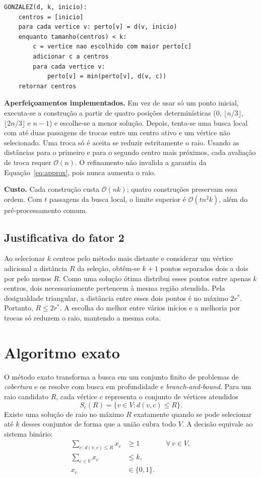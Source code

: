 \documentclass[12pt,a4paper]{article}
\newcommand{\bigO}[1]{\mathcal O\!\left(#1\right)}
\begin{document}
\begin{lstlisting}[caption={Construção aproximada dos centros (uma inicialização).}]
GONZALEZ(d, k, inicio):
    centros = [inicio]
    para cada vertice v: perto[v] = d(v, inicio)
    enquanto tamanho(centros) < k:
        c = vertice nao escolhido com maior perto[c]
        adicionar c a centros
        para cada vertice v:
            perto[v] = min(perto[v], d(v, c))
    retornar centros
\end{lstlisting}

\noindent\textbf{Aperfeiçoamentos implementados.}
Em vez de usar só um ponto inicial, executa-se a construção a partir de
quatro posições determinísticas ($0$, $\lfloor n/3\rfloor$,
$\lfloor 2n/3\rfloor$ e $n-1$) e escolhe-se a menor solução.
Depois, tenta-se uma busca local com até duas passagens de trocas entre
um centro ativo e um vértice não selecionado. Uma troca só é aceita se
reduzir estritamente o raio. Usando as distâncias para o primeiro e para
o segundo centro mais próximos, cada avaliação de troca requer
$\bigO{n}$. O refinamento não invalida a garantia da
Equação~\ref{eq:approx}, pois nunca aumenta o raio.

\noindent\textbf{Custo.}
Cada construção custa $\bigO{nk}$; quatro construções preservam essa
ordem. Com $t$ passagens da busca local, o limite superior é
$\bigO{tn^2k}$, além do pré-processamento comum.

\subsection{Justificativa do fator 2}
Ao selecionar $k$ centros pelo método mais distante e considerar um
vértice adicional a distância $R$ da seleção, obtêm-se $k+1$ pontos
separados dois a dois por pelo menos $R$. Como uma solução ótima distribui
esses pontos entre apenas $k$ centros, dois necessariamente pertencem à
mesma região atendida. Pela desigualdade triangular, a distância entre
esses dois pontos é no máximo $2r^*$. Portanto, $R\leq 2r^*$.
A escolha do melhor entre vários inícios e a melhoria por trocas só
reduzem o raio, mantendo a mesma cota.

\section{Algoritmo exato}
O método exato transforma a busca em um conjunto finito de problemas
de \emph{cobertura} e os resolve com busca em profundidade e
\emph{branch-and-bound}. Para um raio candidato $R$, cada vértice $c$
representa o conjunto de vértices atendidos
\begin{equation}
 S_c(R)=\{v\in V : d(v,c)\leq R\}.
\end{equation}
Existe uma solução de raio no máximo $R$ exatamente quando se pode
selecionar até $k$ desses conjuntos de forma que a união cubra todo $V$.
A decisão equivale ao sistema binário:
\begin{align}
 \sum_{c:\,d(v,c)\leq R}x_c &\geq 1 &&\forall\,v\in V,\\
 \sum_{c\in V}x_c &\leq k,\\
 x_c &\in\{0,1\}.\nonumber
\end{align}
\end{document}
